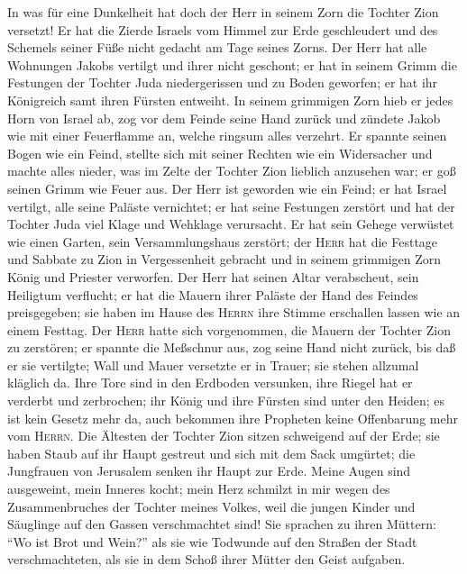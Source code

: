  In was für eine Dunkelheit hat doch der Herr in seinem
Zorn die Tochter Zion versetzt! Er hat die Zierde Israels vom Himmel zur
Erde geschleudert und des Schemels seiner Füße nicht gedacht am Tage
seines Zorns.  Der Herr hat alle Wohnungen Jakobs vertilgt
und ihrer nicht geschont; er hat in seinem Grimm die Festungen der
Tochter Juda niedergerissen und zu Boden geworfen; er hat ihr Königreich
samt ihren Fürsten entweiht.  In seinem grimmigen Zorn
hieb er jedes Horn von Israel ab, zog vor dem Feinde seine Hand zurück
und zündete Jakob wie mit einer Feuerflamme an, welche ringsum alles
verzehrt.  Er spannte seinen Bogen wie ein Feind, stellte
sich mit seiner Rechten wie ein Widersacher und machte alles nieder, was
im Zelte der Tochter Zion lieblich anzusehen war; er goß seinen Grimm
wie Feuer aus.  Der Herr ist geworden wie ein Feind; er
hat Israel vertilgt, alle seine Paläste vernichtet; er hat seine
Festungen zerstört und hat der Tochter Juda viel Klage und Wehklage
verursacht.  Er hat sein Gehege verwüstet wie einen
Garten, sein Versammlungshaus zerstört; der \textsc{Herr} hat die
Festtage und Sabbate zu Zion in Vergessenheit gebracht und in seinem
grimmigen Zorn König und Priester verworfen.  Der Herr hat
seinen Altar verabscheut, sein Heiligtum verflucht; er hat die Mauern
ihrer Paläste der Hand des Feindes preisgegeben; sie haben im Hause des
\textsc{Herrn} ihre Stimme erschallen lassen wie an einem Festtag.
 Der \textsc{Herr} hatte sich vorgenommen, die Mauern der
Tochter Zion zu zerstören; er spannte die Meßschnur aus, zog seine Hand
nicht zurück, bis daß er sie vertilgte; Wall und Mauer versetzte er in
Trauer; sie stehen allzumal kläglich da.  Ihre Tore sind
in den Erdboden versunken, ihre Riegel hat er verderbt und zerbrochen;
ihr König und ihre Fürsten sind unter den Heiden; es ist kein Gesetz
mehr da, auch bekommen ihre Propheten keine Offenbarung mehr vom
\textsc{Herrn}.  Die Ältesten der Tochter Zion sitzen
schweigend auf der Erde; sie haben Staub auf ihr Haupt gestreut und sich
mit dem Sack umgürtet; die Jungfrauen von Jerusalem senken ihr Haupt zur
Erde.  Meine Augen sind ausgeweint, mein Inneres kocht;
mein Herz schmilzt in mir wegen des Zusammenbruches der Tochter meines
Volkes, weil die jungen Kinder und Säuglinge auf den Gassen
verschmachtet sind!  Sie sprachen zu ihren Müttern: ``Wo
ist Brot und Wein?'' als sie wie Todwunde auf den Straßen der Stadt
verschmachteten, als sie in dem Schoß ihrer Mütter den Geist aufgaben.
